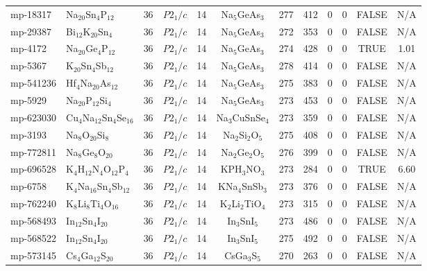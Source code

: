 {\begin{longtable}{llcccccccccc}
    mp-18317 & Na$_{20}$Sn$_{4}$P$_{12}$ & 36    & $P2_1/c$ & 14    & Na$_{5}$GeAs$_{3}$ & 277   & 412   & 0     & 0     & FALSE & N/A \\
    mp-29387 & Bi$_{12}$K$_{20}$Sn$_{4}$ & 36    & $P2_1/c$ & 14    & Na$_{5}$GeAs$_{3}$ & 272   & 353   & 0     & 0     & FALSE & N/A \\
    mp-4172 & Na$_{20}$Ge$_{4}$P$_{12}$ & 36    & $P2_1/c$ & 14    & Na$_{5}$GeAs$_{3}$ & 274   & 428   & 0     & 0     & TRUE  & 1.01  \\
    mp-5367 & K$_{20}$Sn$_{4}$Sb$_{12}$ & 36    & $P2_1/c$ & 14    & Na$_{5}$GeAs$_{3}$ & 278   & 414   & 0     & 0     & FALSE & N/A \\
    mp-541236 & Hf$_{4}$Na$_{20}$As$_{12}$ & 36    & $P2_1/c$ & 14    & Na$_{5}$GeAs$_{3}$ & 275   & 383   & 0     & 0     & FALSE & N/A \\
    mp-5929 & Na$_{20}$P$_{12}$Si$_{4}$ & 36    & $P2_1/c$ & 14    & Na$_{5}$GeAs$_{3}$ & 273   & 453   & 0     & 0     & FALSE & N/A \\
    mp-623030 & Cu$_{4}$Na$_{12}$Sn$_{4}$Se$_{16}$ & 36    & $P2_1/c$ & 14    & Na$_{3}$CuSnSe$_{4}$ & 273   & 359   & 0     & 0     & FALSE & N/A \\
    mp-3193 & Na$_{8}$O$_{20}$Si$_{8}$ & 36    & $P2_1/c$ & 14    & Na$_{2}$Si$_{2}$O$_{5}$ & 275   & 408   & 0     & 0     & FALSE & N/A \\
    mp-772811 & Na$_{8}$Ge$_{8}$O$_{20}$ & 36    & $P2_1/c$ & 14    & Na$_{2}$Ge$_{2}$O$_{5}$ & 276   & 399   & 0     & 0     & FALSE & N/A \\
    mp-696528 & K$_{4}$H$_{12}$N$_{4}$O$_{12}$P$_{4}$ & 36    & $P2_1/c$ & 14    & KPH$_{3}$NO$_{3}$ & 273   & 284   & 0     & 0     & TRUE  & 6.60  \\
    mp-6758 & K$_{4}$Na$_{16}$Sn$_{4}$Sb$_{12}$ & 36    & $P2_1/c$ & 14    & KNa$_{4}$SnSb$_{3}$ & 273   & 376   & 0     & 0     & FALSE & N/A \\
    mp-762240 & K$_{8}$Li$_{8}$Ti$_{4}$O$_{16}$ & 36    & $P2_1/c$ & 14    & K$_{2}$Li$_{2}$TiO$_{4}$ & 273   & 315   & 0     & 0     & FALSE & N/A \\
    mp-568493 & In$_{12}$Sn$_{4}$I$_{20}$ & 36    & $P2_1/c$ & 14    & In$_{3}$SnI$_{5}$ & 273   & 486   & 0     & 0     & FALSE & N/A \\
    mp-568522 & In$_{12}$Sn$_{4}$I$_{20}$ & 36    & $P2_1/c$ & 14    & In$_{3}$SnI$_{5}$ & 275   & 492   & 0     & 0     & FALSE & N/A \\
    mp-573145 & Cs$_{4}$Ga$_{12}$S$_{20}$ & 36    & $P2_1/c$ & 14    & CsGa$_{3}$S$_{5}$ & 270   & 263   & 0     & 0     & FALSE & N/A \\

\end{longtable}}
